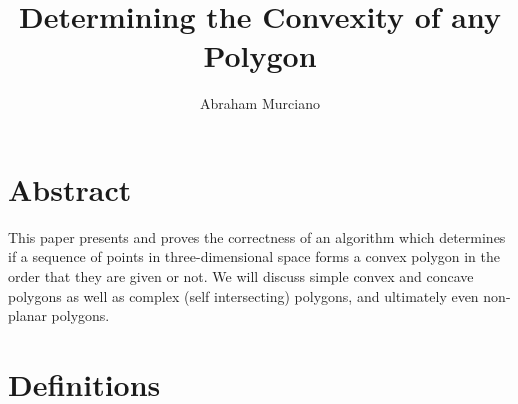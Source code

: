 \documentclass{article}
\title{Determining the Convexity of any Polygon}
\author{Abraham Murciano}
\begin{document}
\maketitle

\section{Abstract}

This paper presents and proves the correctness of an algorithm which determines if a sequence of points in three-dimensional space forms a convex polygon in the order that they are given or not. We will discuss simple convex and concave polygons as well as complex (self intersecting) polygons, and ultimately even non-planar polygons.

\section{Definitions}
\end{document}
